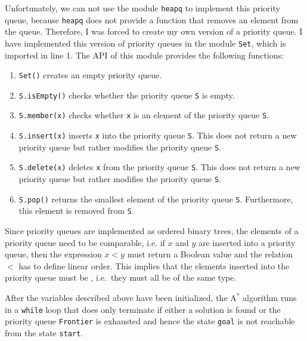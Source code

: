 \begin{enumerate}
      Unfortunately, we can not use the module \texttt{heapq} to implement this priority queue,
      because \texttt{heapq} does not provide a function that removes an element from the queue.
      Therefore, I was forced to create my own version of a priority queue.  I have implemented 
      this version of priority queues in the module \texttt{Set}, which is imported in line 1.
      The API of this module provides the following functions:
      \begin{enumerate}
      \item \texttt{Set()} creates an empty priority queue.
      \item \texttt{S.isEmpty()} checks whether the priority queue \texttt{S} is empty.
      \item \texttt{S.member(x)} checks whether \texttt{x} is an element of the priority queue \texttt{S}.
      \item \texttt{S.insert(x)} inserts \texttt{x} into the priority queue \texttt{S}.
            This does not return a new priority queue but rather modifies the priority queue \texttt{S}.
      \item \texttt{S.delete(x)} deletes \texttt{x} from the priority queue \texttt{S}.
            This does not return a new priority queue but rather modifies the priority queue \texttt{S}.
      \item \texttt{S.pop()} returns the smallest element of the priority queue \texttt{S}.
            Furthermore, this element is removed from \texttt{S}.
      \end{enumerate}
      Since priority queues are implemented as ordered binary trees, the elements of a priority queue need to
      be comparable, i.e. if $x$ and $y$ are inserted into a priority queue, then the  
      expression $x < y$ must return a Boolean value and the relation $<$ has to define 
      linear order.  This implies that the elements inserted into the priority queue must be
      , i.e.~they must all be of the same type.
\end{enumerate}
After the variables described above have been initialized, the $\mathrm{A}^*$ algorithm runs in a
\texttt{while} loop that does only terminate if either a solution is found or the priority queue
\texttt{Frontier} is exhausted and hence the state \texttt{goal} is not reachable from the state \texttt{start}. 

